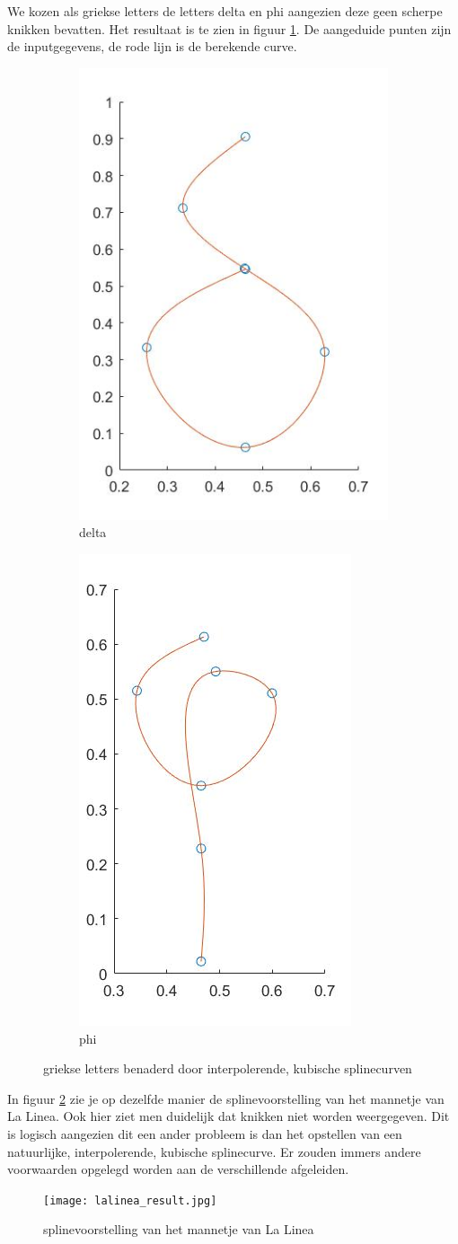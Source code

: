 We kozen als griekse letters de letters delta en phi aangezien deze geen scherpe knikken bevatten. Het resultaat is te zien in figuur \ref{fig:griekse_letters}. De aangeduide punten zijn de inputgegevens, de rode lijn is de berekende curve.

\begin{figure}[H]
\centering
\begin{subfigure}{.5\textwidth}
  \centering
  \includegraphics[width=.4\linewidth]{afbeeldingen/delta_result.jpg}
  \caption{delta}
\end{subfigure}%
\begin{subfigure}{.5\textwidth}
  \centering
  \includegraphics[width=.4\linewidth]{afbeeldingen/phi_result.jpg}
  \caption{phi}
\end{subfigure}
\caption{griekse letters benaderd door interpolerende, kubische splinecurven}
\label{fig:griekse_letters}
\end{figure}

In figuur \ref{fig:lalinea} zie je op dezelfde manier de splinevoorstelling van het mannetje van La Linea. Ook hier ziet men duidelijk dat knikken niet worden weergegeven. Dit is logisch aangezien dit een ander probleem is dan het opstellen van een natuurlijke, interpolerende, kubische splinecurve. Er zouden immers andere voorwaarden opgelegd worden aan de verschillende afgeleiden.

\begin{figure}[H]
    \centering
    \texttt{[image: lalinea\_result.jpg]}
    \caption{splinevoorstelling van het mannetje van La Linea}
    \label{fig:lalinea}
\end{figure}